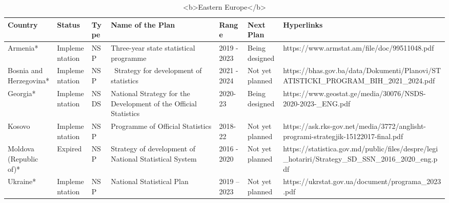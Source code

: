 \documentclass[
]{article}
\begin{document}
\begin{table}

\caption{\label{tab:unnamed-chunk-5}<b>Eastern Europe</b>}
\centering
\begin{tabular}[t]{lllllll}
\toprule
Country & Status & Type & Name of the Plan & Range & Next Plan & Hyperlinks\\
\midrule
Armenia* & Implementation & NSP & Three-year state statistical programme & 2019 - 2023 & Being designed & https://www.armstat.am/file/doc/99511048.pdf\\
Bosnia and Herzegovina* & Implementation & NSP &  Strategy for development of statistics & 2021 - 2024 & Not yet planned & https://bhas.gov.ba/data/Dokumenti/Planovi/STATISTICKI\_PROGRAM\_BIH\_2021\_2024.pdf\\
Georgia* & Implementation & NSDS & National Strategy for the Development of the Official Statistics & 2020-23 & Being designed & https://www.geostat.ge/media/30076/NSDS-2020-2023-\_ENG.pdf\\
Kosovo & Implementation & NSP & Programme of Official Statistics & 2018-22 & Not yet planned & https://ask.rks-gov.net/media/3772/anglisht-programi-strategjik-15122017-final.pdf\\
Moldova (Republic of)* & Expired & NSP & Strategy of development of National Statistical System  & 2016 - 2020 & Not yet planned & https://statistica.gov.md/public/files/despre/legi\_hotariri/Strategy\_SD\_SSN\_2016\_2020\_eng.pdf\\
\addlinespace
Ukraine* & Implementation & NSP & National Statistical Plan & 2019 – 2023 & Not yet planned & https://ukrstat.gov.ua/document/programa\_2023.pdf\\
\bottomrule
\end{tabular}
\end{table}
\end{document}
